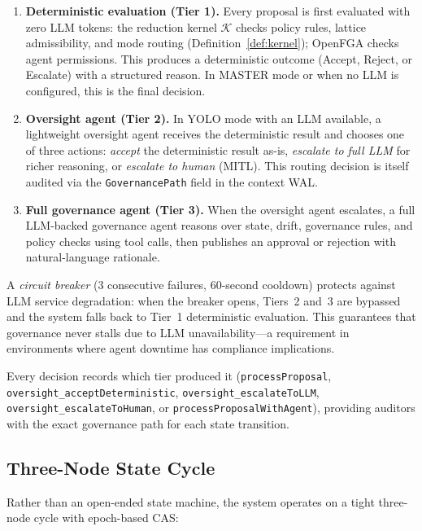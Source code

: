 \documentclass[11pt]{article}
\begin{document}
\begin{enumerate}
  \item \textbf{Deterministic evaluation (Tier 1).} Every proposal is first evaluated with zero LLM tokens: the reduction kernel $\mathcal{K}$ checks policy rules, lattice admissibility, and mode routing (Definition~\ref{def:kernel}); OpenFGA checks agent permissions. This produces a deterministic outcome (Accept, Reject, or Escalate) with a structured reason. In MASTER mode or when no LLM is configured, this is the final decision.

  \item \textbf{Oversight agent (Tier 2).} In YOLO mode with an LLM available, a lightweight oversight agent receives the deterministic result and chooses one of three actions: \emph{accept} the deterministic result as-is, \emph{escalate to full LLM} for richer reasoning, or \emph{escalate to human} (MITL). This routing decision is itself audited via the \texttt{GovernancePath} field in the context WAL.

  \item \textbf{Full governance agent (Tier 3).} When the oversight agent escalates, a full LLM-backed governance agent reasons over state, drift, governance rules, and policy checks using tool calls, then publishes an approval or rejection with natural-language rationale.
\end{enumerate}

A \emph{circuit breaker} (3 consecutive failures, 60-second cooldown) protects against LLM service degradation: when the breaker opens, Tiers~2 and~3 are bypassed and the system falls back to Tier~1 deterministic evaluation. This guarantees that governance never stalls due to LLM unavailability---a requirement in environments where agent downtime has compliance implications.

Every decision records which tier produced it (\texttt{processProposal}, \texttt{oversight\_acceptDeterministic}, \texttt{oversight\_escalateToLLM}, \texttt{oversight\_escalateToHuman}, or \texttt{processProposalWithAgent}), providing auditors with the exact governance path for each state transition.

\subsection{Three-Node State Cycle}

Rather than an open-ended state machine, the system operates on a tight three-node cycle with epoch-based CAS:
\end{document}
